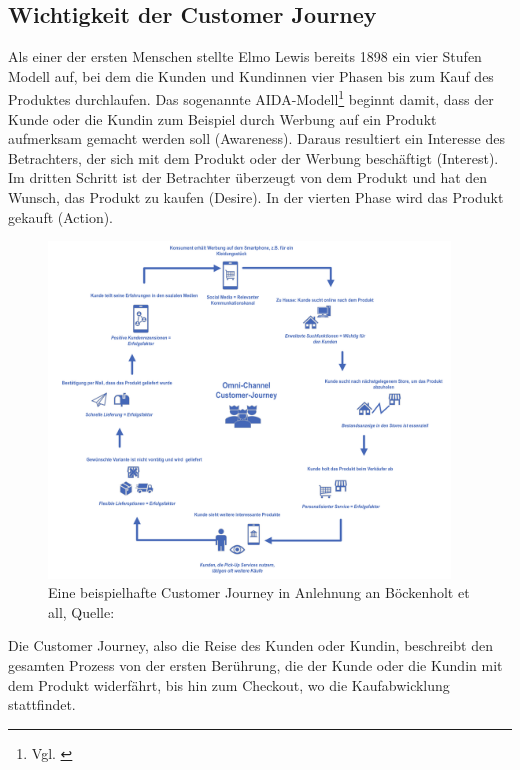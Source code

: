 \subsection{Wichtigkeit der Customer Journey}\label{unterabschnitt_3_2}
Als einer der ersten Menschen stellte Elmo Lewis bereits 1898 ein vier Stufen Modell auf, bei dem die Kunden und Kundinnen  vier Phasen bis zum Kauf des Produktes durchlaufen. Das sogenannte AIDA-Modell\footnote{Vgl. \autocite [Online] {Heubel2019}} beginnt damit, dass der Kunde oder die Kundin zum Beispiel durch Werbung auf ein Produkt aufmerksam gemacht werden soll (Awareness). Daraus resultiert ein Interesse des Betrachters, der sich mit dem Produkt oder der Werbung beschäftigt (Interest). Im dritten Schritt ist der Betrachter überzeugt von dem Produkt und hat den Wunsch, das Produkt zu kaufen (Desire).  In der vierten Phase wird das Produkt gekauft (Action).
\begin{figure}[!ht]
    \centering
    \includegraphics[width=0.95\textwidth,angle=0]{src/abbildungen/customer_journey.png}
    \caption[Quelle: Konzepte und Strategien für Omnichannel-Exzellenz S. 26, 2018]{Eine beispielhafte Customer Journey in Anlehnung an Böckenholt et all, Quelle: \autocite {Boeckenholt2018}}
   \label{customer_journey_2018}
   \end{figure}

\newpage
Die Customer Journey, also die Reise des Kunden oder Kundin, beschreibt den gesamten Prozess von der ersten Berührung, die der Kunde oder die Kundin mit dem Produkt widerfährt, bis hin zum Checkout, wo die Kaufabwicklung stattfindet.
\newline

